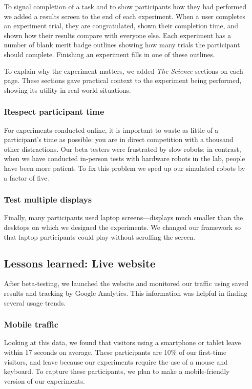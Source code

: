 To signal completion of a task and to show participants how they had performed we added a results screen to the end of each experiment. When a user completes an experiment trial, they are congratulated, shown their completion time, and shown how their results compare with everyone else. Each experiment has a number of blank merit badge outlines showing how many trials the participant should complete. Finishing an experiment fills in one of these outlines. 

To explain why the experiment matters, we added  \emph{The Science} sections on each page. These sections gave practical context to the experiment being performed, showing its utility in real-world situations.

\subsubsection{Respect participant time}
For experiments conducted online, it is important to waste as little of a participant's time as possible: you are in direct competition with a thousand other distractions. Our beta testers were frustrated by slow robots; in contrast, when we have conducted in-person tests with hardware robots in the lab, people have been more patient. To fix this problem we sped up our simulated robots by a factor of five.




\subsubsection{Test multiple displays}

Finally, many participants used laptop screens---displays much smaller than the desktops on which we designed the experiments. We changed our framework so that laptop participants could play without scrolling the screen.

\subsection{Lessons learned: Live website}


After beta-testing, we launched the website and monitored our traffic using saved results and tracking by Google Analytics. This information was helpful in finding several usage trends.

\subsubsection{Mobile traffic}
 Looking at this data, we found that visitors using a smartphone or tablet leave within 17 seconds on average. These participants are 10\% of our first-time visitors, and leave because our experiments require the use of a mouse and keyboard. To capture these participants, we plan to make a mobile-friendly version of our experiments.

